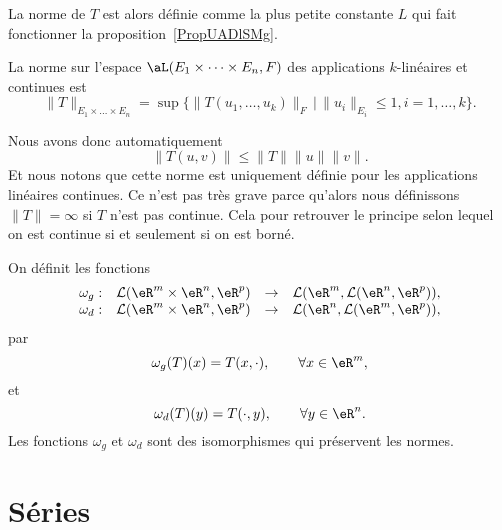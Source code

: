 La norme de \( T\) est alors définie comme la plus petite constante \( L\) qui fait fonctionner la proposition~\ref{PropUADlSMg}.
\begin{definition}  \label{DefKPBYeyG}
	La norme sur l'espace \( \aL(E_1\times \cdots\times E_n, F)\) des applications \( k\)-linéaires et continues est
	\begin{equation}
		\|T\|_{E_1\times \ldots\times E_n}=\sup\{ \|T(u_1, \ldots,u_k)\|_{F}\,\vert\,\|u_i\|_{E_i}\leq 1, i=1,\ldots, k \}.
	\end{equation}
\end{definition}
Nous avons donc automatiquement
\begin{equation}    \label{EqYLnbRbC}
	\| T(u,v) \|\leq \| T \|\| u \|\| v \|.
\end{equation}
Et nous notons que cette norme est uniquement définie pour les applications linéaires continues. Ce n'est pas très grave parce qu'alors nous définissons \( \| T \|=\infty\) si \( T\) n'est pas continue. Cela pour retrouver le principe selon lequel on est continue si et seulement si on est borné.

\begin{proposition}\label{isom_isom}
	On définit les fonctions
	\begin{equation}
		\begin{array}{rccc}
			\omega_g: & \mathcal{L}(\eR^{m}\times\eR^{n}, \eR^p) & \to & \mathcal{L}(\eR^{m}, \mathcal{L}(\eR^{n}, \eR^p)), \\
			\omega_d: & \mathcal{L}(\eR^{m}\times\eR^{n}, \eR^p) & \to & \mathcal{L}(\eR^{n}, \mathcal{L}(\eR^{m}, \eR^p)),
		\end{array}
	\end{equation}
	par
	\[
		\omega_g(T)(x)=T(x,\cdot), \qquad \forall x\in\eR^m,
	\]
	et
	\[
		\omega_d(T)(y)=T(\cdot, y), \qquad \forall y\in\eR^n.
	\]
	Les fonctions \( \omega_g\) et \( \omega_d\) sont des isomorphismes qui préservent les normes.
\end{proposition}

\section{Séries}
\label{SECooYCQBooSZNXhd}

